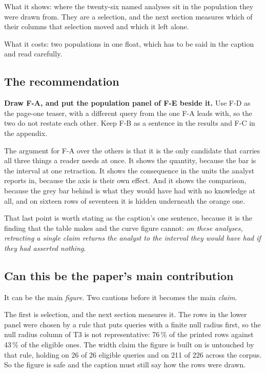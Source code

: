 What it shows: where the twenty-six named analyses sit in the population they were drawn from. They
are a selection, and the next section measures which of their columns that selection moved and which
it left alone.

What it costs: two populations in one float, which has to be said in the caption and read carefully.

\subsection{The recommendation}

\begin{verdict}
\textbf{Draw F-A, and put the population panel of F-E beside it.} Use F-D as the page-one teaser,
with a different query from the one F-A leads with, so the two do not restate each other. Keep F-B
as a sentence in the results and F-C in the appendix.
\end{verdict}

The argument for F-A over the others is that it is the only candidate that carries all three things
a reader needs at once. It shows the quantity, because the bar is the interval at one retraction.
It shows the consequence in the units the analyst reports in, because the axis is their own effect.
And it shows the comparison, because the grey bar behind is what they would have had with no
knowledge at all, and on sixteen rows of seventeen it is hidden underneath the orange one.

That last point is worth stating as the caption's one sentence, because it is the finding that the
table makes and the curve figure cannot: \emph{on these analyses, retracting a single claim returns
the analyst to the interval they would have had if they had asserted nothing}.

\subsection{Can this be the paper's main contribution}

It can be the main \emph{figure}. Two cautions before it becomes the main \emph{claim}.

The first is selection, and the next section measures it. The rows in the lower panel were chosen by
a rule that puts queries with a finite null radius first, so the null radius column of T3 is not
representative: 76\,\% of the printed rows against 43\,\% of the eligible ones. The width claim the
figure is built on is untouched by that rule, holding on 26 of 26 eligible queries and on 211 of 226
across the corpus. So the figure is safe and the caption must still say how the rows were drawn.

